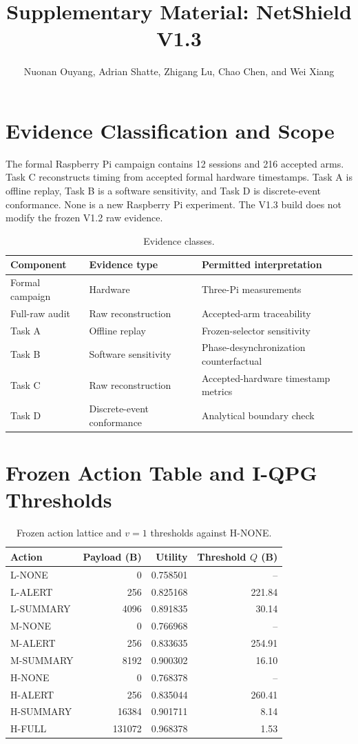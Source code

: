 \documentclass[10pt,onecolumn]{IEEEtran}
\begin{document}
\title{Supplementary Material: NetShield V1.3}
\author{Nuonan Ouyang, Adrian Shatte, Zhigang Lu, Chao Chen, and Wei Xiang}
\maketitle

\section{Evidence Classification and Scope}
The formal Raspberry Pi campaign contains 12 sessions and 216 accepted arms. Task C reconstructs timing from accepted formal hardware timestamps. Task A is offline replay, Task B is a software sensitivity, and Task D is discrete-event conformance. None is a new Raspberry Pi experiment. The V1.3 build does not modify the frozen V1.2 raw evidence.

\begin{table}[h]\centering\caption{Evidence classes.}\begin{tabular}{lll}\toprule
Component & Evidence type & Permitted interpretation\\\midrule
Formal campaign & Hardware & Three-Pi measurements\\
Full-raw audit & Raw reconstruction & Accepted-arm traceability\\
Task A & Offline replay & Frozen-selector sensitivity\\
Task B & Software sensitivity & Phase-desynchronization counterfactual\\
Task C & Raw reconstruction & Accepted-hardware timestamp metrics\\
Task D & Discrete-event conformance & Analytical boundary check\\\bottomrule
\end{tabular}\end{table}

\section{Frozen Action Table and I-QPG Thresholds}
\begin{table}[h]\centering\caption{Frozen action lattice and $v=1$ thresholds against H-NONE.}\begin{tabular}{lrrr}\toprule
Action & Payload (B) & Utility & Threshold $Q$ (B)\\\midrule
L-NONE&0&0.758501&--\\ L-ALERT&256&0.825168&221.84\\ L-SUMMARY&4096&0.891835&30.14\\
M-NONE&0&0.766968&--\\ M-ALERT&256&0.833635&254.91\\ M-SUMMARY&8192&0.900302&16.10\\
H-NONE&0&0.768378&--\\ H-ALERT&256&0.835044&260.41\\ H-SUMMARY&16384&0.901711&8.14\\ H-FULL&131072&0.968378&1.53\\\bottomrule
\end{tabular}\end{table}
\end{document}
